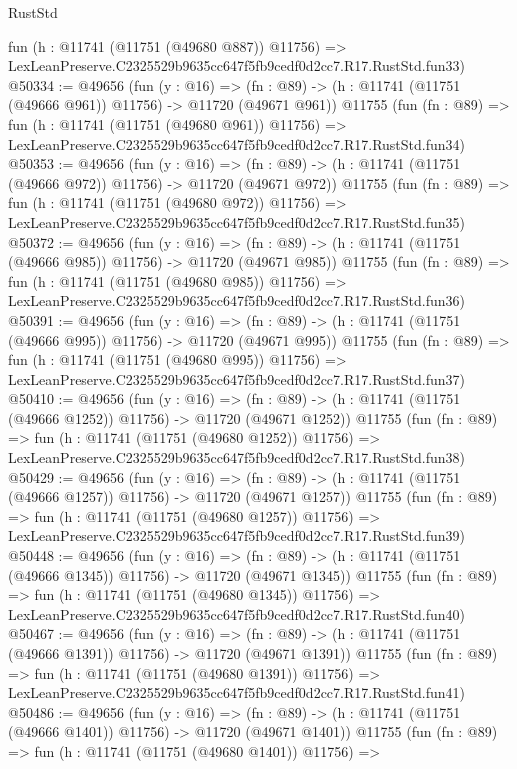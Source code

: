\begin{lexlean}{RustStd}
\begin{coremodule}
    fun (h : @11741 (@11751 (@49680 @887)) @11756) =>
    LexLeanPreserve.C2325529b9635cc647f5fb9cedf0d2cc7.R17.RustStd.fun33)
@50334 := @49656
    (fun (y : @16) =>
    (fn : @89) -> (h : @11741 (@11751 (@49666 @961)) @11756) -> @11720 (@49671 @961))
    @11755
    (fun (fn : @89) =>
    fun (h : @11741 (@11751 (@49680 @961)) @11756) =>
    LexLeanPreserve.C2325529b9635cc647f5fb9cedf0d2cc7.R17.RustStd.fun34)
@50353 := @49656
    (fun (y : @16) =>
    (fn : @89) -> (h : @11741 (@11751 (@49666 @972)) @11756) -> @11720 (@49671 @972))
    @11755
    (fun (fn : @89) =>
    fun (h : @11741 (@11751 (@49680 @972)) @11756) =>
    LexLeanPreserve.C2325529b9635cc647f5fb9cedf0d2cc7.R17.RustStd.fun35)
@50372 := @49656
    (fun (y : @16) =>
    (fn : @89) -> (h : @11741 (@11751 (@49666 @985)) @11756) -> @11720 (@49671 @985))
    @11755
    (fun (fn : @89) =>
    fun (h : @11741 (@11751 (@49680 @985)) @11756) =>
    LexLeanPreserve.C2325529b9635cc647f5fb9cedf0d2cc7.R17.RustStd.fun36)
@50391 := @49656
    (fun (y : @16) =>
    (fn : @89) -> (h : @11741 (@11751 (@49666 @995)) @11756) -> @11720 (@49671 @995))
    @11755
    (fun (fn : @89) =>
    fun (h : @11741 (@11751 (@49680 @995)) @11756) =>
    LexLeanPreserve.C2325529b9635cc647f5fb9cedf0d2cc7.R17.RustStd.fun37)
@50410 := @49656
    (fun (y : @16) =>
    (fn : @89) -> (h : @11741 (@11751 (@49666 @1252)) @11756) -> @11720 (@49671 @1252))
    @11755
    (fun (fn : @89) =>
    fun (h : @11741 (@11751 (@49680 @1252)) @11756) =>
    LexLeanPreserve.C2325529b9635cc647f5fb9cedf0d2cc7.R17.RustStd.fun38)
@50429 := @49656
    (fun (y : @16) =>
    (fn : @89) -> (h : @11741 (@11751 (@49666 @1257)) @11756) -> @11720 (@49671 @1257))
    @11755
    (fun (fn : @89) =>
    fun (h : @11741 (@11751 (@49680 @1257)) @11756) =>
    LexLeanPreserve.C2325529b9635cc647f5fb9cedf0d2cc7.R17.RustStd.fun39)
@50448 := @49656
    (fun (y : @16) =>
    (fn : @89) -> (h : @11741 (@11751 (@49666 @1345)) @11756) -> @11720 (@49671 @1345))
    @11755
    (fun (fn : @89) =>
    fun (h : @11741 (@11751 (@49680 @1345)) @11756) =>
    LexLeanPreserve.C2325529b9635cc647f5fb9cedf0d2cc7.R17.RustStd.fun40)
@50467 := @49656
    (fun (y : @16) =>
    (fn : @89) -> (h : @11741 (@11751 (@49666 @1391)) @11756) -> @11720 (@49671 @1391))
    @11755
    (fun (fn : @89) =>
    fun (h : @11741 (@11751 (@49680 @1391)) @11756) =>
    LexLeanPreserve.C2325529b9635cc647f5fb9cedf0d2cc7.R17.RustStd.fun41)
@50486 := @49656
    (fun (y : @16) =>
    (fn : @89) -> (h : @11741 (@11751 (@49666 @1401)) @11756) -> @11720 (@49671 @1401))
    @11755
    (fun (fn : @89) =>
    fun (h : @11741 (@11751 (@49680 @1401)) @11756) =>

\end{coremodule}
\end{lexlean}

